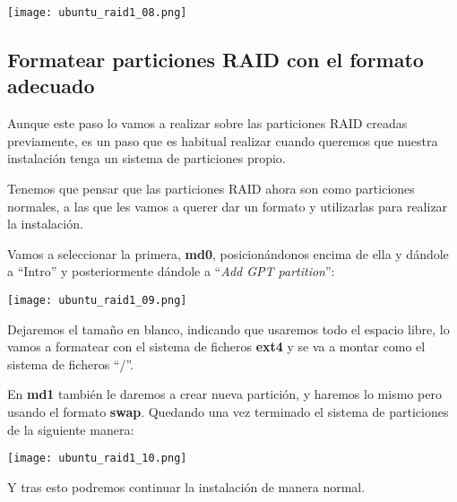 \begin{center}
    \texttt{[image: ubuntu\_raid1\_08.png]}
\end{center}

\subsection{Formatear particiones RAID con el formato adecuado}
Aunque este paso lo vamos a realizar sobre las particiones RAID creadas previamente, es un paso que es habitual realizar cuando queremos que nuestra instalación tenga un sistema de particiones propio.

Tenemos que pensar que las particiones RAID ahora son como particiones normales, a las que les vamos a querer dar un formato y utilizarlas para realizar la instalación.

Vamos a seleccionar la primera, \textbf{md0}, posicionándonos encima de ella y dándole a “Intro” y posteriormente dándole a “\textit{Add GPT partition}”:

\begin{center}
    \texttt{[image: ubuntu\_raid1\_09.png]}
\end{center}

Dejaremos el tamaño en blanco, indicando que usaremos todo el espacio libre, lo vamos a formatear con el sistema de ficheros \textbf{ext4} y se va a montar como el sistema de ficheros “/”.

En \textbf{md1} también le daremos a crear nueva partición, y haremos lo mismo pero usando el formato \textbf{swap}. Quedando una vez terminado el sistema de particiones de la siguiente manera:

\begin{center}
    \texttt{[image: ubuntu\_raid1\_10.png]}
\end{center}

Y tras esto podremos continuar la instalación de manera normal.
\clearpage